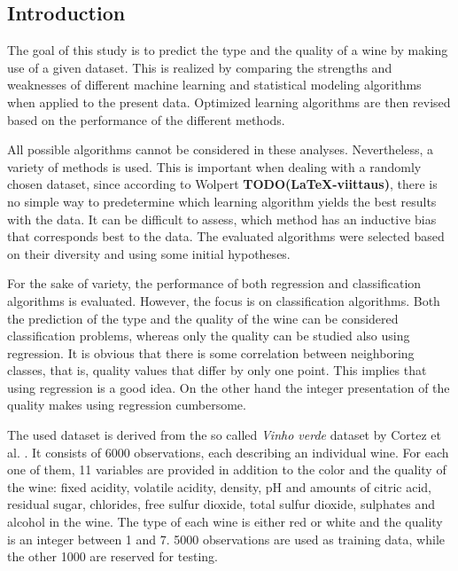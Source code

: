 \documentclass[twoside]{article}
\newcommand{\todo}[1]{\textbf{TODO(#1)}}
\begin{document}
\begin{multicols}{2} %

\section{Introduction}

The goal of this study is to predict the type and the quality of a wine by making use of a given dataset.
This is realized by comparing the strengths and weaknesses of different machine learning 
and statistical modeling algorithms when applied to the present data. Optimized learning algorithms
are then revised based on the performance of the different methods.
 
All possible algorithms cannot be considered in these analyses. Nevertheless,
a variety of methods is used. This is important when dealing with a randomly chosen dataset, since according to
Wolpert \todo{\LaTeX-viittaus}, there is no simple way to predetermine which
learning algorithm yields the best results with the data. It can be difficult to assess,
which method has an inductive bias that corresponds best to the data.
The evaluated algorithms were selected based on their diversity and using some initial hypotheses.

For the sake of variety, the performance of both regression and classification algorithms is evaluated.
However, the focus is on classification algorithms. 
Both the prediction of the type and the quality of the wine can be considered
classification problems, whereas only the quality can be studied also using regression. It is obvious that
there is some correlation between neighboring classes, that is, quality values that differ by only one point. This implies that
using regression is a good idea. On the other hand the integer presentation of the quality makes using regression cumbersome.

The used dataset is derived from the so called \emph{Vinho verde} dataset by Cortez et al. \cite{CorCer09}.
It consists of 6000 observations, each describing an individual wine. For each one of them, 11 variables are provided in addition
to the color and the quality of the wine: fixed acidity, volatile acidity, density, pH and amounts of citric acid, residual sugar, chlorides, 
free sulfur dioxide, total sulfur dioxide, sulphates and alcohol in the wine. The type of each wine is either red or white 
and the quality is an integer between 1 and 7. 5000 observations are used as training data, while the other 1000 are reserved for testing.


\end{multicols}
\end{document}

